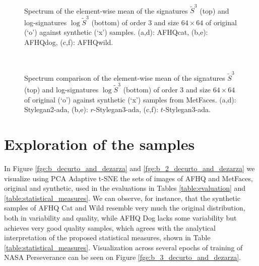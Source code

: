 \documentclass[lettersize,journal]{IEEEtran}
\begin{document}
\begin{figure}[ht]
\centering
{}
 \\
\caption{Spectrum of the element-wise mean of the signatures $\tilde{S}^{3}$ (top) and log-signatures $\log \tilde{S}^{3}$ (bottom) of order 3 and size $64\times64$ of original (`o') against synthetic (`x') samples. (a,d): AFHQcat, (b,e): AFHQdog, (c,f): AFHQwild.}
\label{fge:23_decurto_and_dezarza}
\end{figure}

\begin{figure}[ht]
\centering
{}
\\
\caption{Spectrum comparison of the element-wise mean of the signatures $\tilde{S}^{3}$ (top) and log-signatures $\log \tilde{S}^{3}$ (bottom) of order 3 and size $64\times64$ of original (`o') against synthetic (`x') samples from MetFaces. (a,d): Stylegan2-ada, (b,e): $r$-Stylegan3-ada, (c,f): $t$-Stylegan3-ada.}
\label{fge:27_decurto_and_dezarza}
\end{figure}

\section{Exploration of the samples}
\label{sn:exploration}

In Figure \ref{fge:b_decurto_and_dezarza} and \ref{fge:b_2_decurto_and_dezarza} we visualize using PCA Adaptive t-SNE the sets of images of AFHQ and MetFaces, original and synthetic, used in the evaluations in Tables \ref{table:evaluation} and \ref{table:statistical_measures}. We can observe, for instance, that the synthetic samples of AFHQ Cat and Wild resemble very much the original distribution, both in variability and quality, while AFHQ Dog lacks some variability but achieves very good quality samples, which agrees with the analytical interpretation of the proposed statistical measures, shown in Table \ref{table:statistical_measures}. Visualization across several epochs of training of NASA Perseverance can be seen on Figure \ref{fge:b_3_decurto_and_dezarza}.
\end{document}
